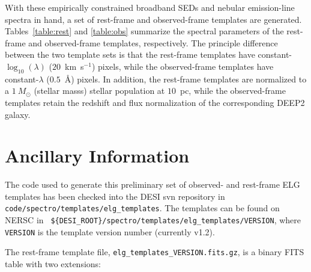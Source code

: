 \documentclass[12pt]{article}
\begin{document}
With these empirically constrained broadband SEDs and nebular
emission-line spectra in hand, a set of rest-frame and observed-frame
templates are generated.  Tables~\ref{table:rest} and \ref{table:obs}
summarize the spectral parameters of the rest-frame and observed-frame
templates, respectively.  The principle difference between the two
template sets is that the rest-frame templates have
constant-$\log_{10}(\lambda)$ ($20$~km~s$^{-1}$) pixels, while the
observed-frame templates have constant-$\lambda$ ($0.5$~\AA) pixels.
In addition, the rest-frame templates are normalized to a
$1~M_{\odot}$ (stellar masss) stellar population at $10$~pc, while the
observed-frame templates retain the redshift and flux normalization of
the corresponding DEEP2 galaxy.



\section{Ancillary Information}

The code used to generate this preliminary set of observed- and
rest-frame ELG templates has been checked into the DESI {\sc svn}
repository in {\tt code/spectro/templates/elg\_templates}.  The
templates can be found on NERSC in {\tt
  \$\{DESI\_ROOT\}/spectro/templates/elg\_templates/VERSION}, where
{\tt VERSION} is the template version number (currently v1.2).  

The rest-frame template file, {\tt elg\_templates\_VERSION.fits.gz},
is a binary FITS table with two extensions:
\end{document}

